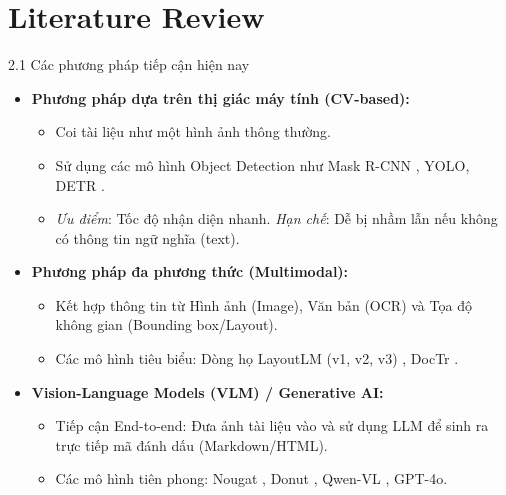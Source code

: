 \documentclass[aspectratio=1610,8pt]{beamer}
\begin{document}
\section{Literature Review}
\begin{frame}{2.1 \; Các phương pháp tiếp cận hiện nay}
    \begin{itemize}
        \item \textbf{Phương pháp dựa trên thị giác máy tính (CV-based):}
        \begin{itemize}
            \item Coi tài liệu như một hình ảnh thông thường.
            \item Sử dụng các mô hình Object Detection như Mask R-CNN \cite{he2017mask}, YOLO, DETR \cite{carion2020end} \cite{dla_2023_arxiv_document_ai_a_comparative_study_of_transformer_based_graph_based_mode}.
            \item \textit{Ưu điểm}: Tốc độ nhận diện nhanh. \textit{Hạn chế}: Dễ bị nhầm lẫn nếu không có thông tin ngữ nghĩa (text).
        \end{itemize}
        \vspace{0.2cm}
        \item \textbf{Phương pháp đa phương thức (Multimodal):}
        \begin{itemize}
            \item Kết hợp thông tin từ Hình ảnh (Image), Văn bản (OCR) và Tọa độ không gian (Bounding box/Layout).
            \item Các mô hình tiêu biểu: Dòng họ LayoutLM (v1, v2, v3) \cite{huang2022layoutlmv3}, DocTr \cite{liao2023doctr}.
        \end{itemize}
        \vspace{0.2cm}
        \item \textbf{Vision-Language Models (VLM) / Generative AI:}
        \begin{itemize}
            \item Tiếp cận End-to-end: Đưa ảnh tài liệu vào và sử dụng LLM để sinh ra trực tiếp mã đánh dấu (Markdown/HTML).
            \item Các mô hình tiên phong: Nougat \cite{nougat_2023}, Donut \cite{kim2022donut}, Qwen-VL \cite{qwen2vl_2023}, GPT-4o.
        \end{itemize}
    \end{itemize}
\end{frame}
\end{document}
